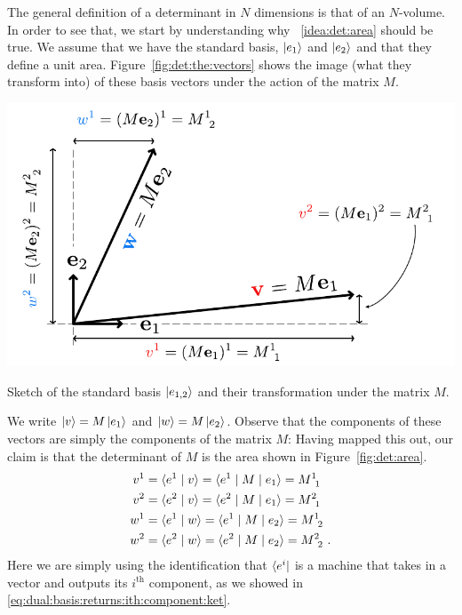 The general definition of a determinant in $N$ dimensions is that of an $N$-volume. In order to see that, we start by understanding why \bigidearef{}~\ref{idea:det:area} should be true. We assume that we have the standard basis, $\left|e_1\right\rangle$ and $\left|e_2\right\rangle$ and that they define a unit area. Figure~\ref{fig:det:the:vectors} shows the image (what they transform into) of these basis vectors under the action of the matrix $M$.
\begin{marginfigure}%
    \includegraphics[width=\textwidth]{figures/det TheVectors.pdf}
    \caption{Sketch of the standard basis $\left|e_{1,2}\right\rangle$ and their transformation under the matrix $M$.}
    \label{fig:det:the:vectors}
\end{marginfigure}
We write $\left|v\right\rangle = M\left|e_1\right\rangle$ and $\left|w\right\rangle = M\left|e_2\right\rangle$. Observe that the components of these vectors are simply the components of the matrix $M$: Having mapped this out, our claim is that the determinant of $M$ is the area shown in Figure~\ref{fig:det:area}.
\begin{align}
    v^1 &= \la e^1 \mid v\ra = \la e^1 \mid M \mid e_1 \ra  = M\aij{1}{1}
    \label{eq:det:v1:inner:prod}
    \\
    v^2 &= \la e^2 \mid v\ra = \la e^2 \mid M \mid e_1 \ra = M\aij{2}{1}
    \\ 
    w^1 &= \la e^1 \mid w\ra = \la e^1 \mid M \mid e_2 \ra  = M\aij{1}{2}
    \\
    w^2 &= \la e^2 \mid w\ra = \la e^2 \mid M \mid e_2 \ra = M\aij{2}{2}
    \label{eq:det:w2:inner:prod}
    \ .
\end{align}
Here we are simply using the identification that $\langle e^i |$ is a machine that takes in a vector and outputs its $i^\text{th}$ component, as we showed in \eqref{eq:dual:basis:returns:ith:component:ket}.
